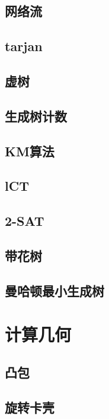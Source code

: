 \documentclass[UTF8,a4paper]{ctexart}
\begin{document}
\subsection{网络流}

\subsection{tarjan}

\subsection{虚树}

\subsection{生成树计数}

\subsection{KM算法}

\subsection{lCT}

\subsection{2-SAT}

\subsection{带花树}

\subsection{曼哈顿最小生成树}

\section{计算几何}

\subsection{凸包}

\subsection{旋转卡壳}
\end{document}

